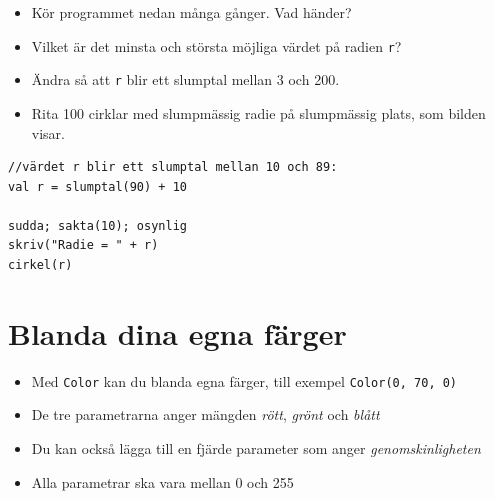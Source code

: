 \begin{itemize}

\item {Kör programmet nedan många gånger. Vad händer?}
\item {Vilket är det minsta och största möjliga värdet på radien \lstinline{r}?}
\item {Ändra så att \lstinline{r} blir ett slumptal mellan 3 och 200.}
\item {Rita 100 cirklar med slumpmässig radie på slumpmässig plats, som bilden visar.}

\end{itemize}



  

\begin{lstlisting}[basicstyle={\ttfamily\fontsize{20}{24}\selectfont},numbers=none]
//värdet r blir ett slumptal mellan 10 och 89:
val r = slumptal(90) + 10   

sudda; sakta(10); osynlig
skriv("Radie = " + r)
cirkel(r)
\end{lstlisting}
        
\chapter{Blanda dina egna färger}

\begin{itemize}

\item {Med \lstinline{Color} kan du blanda egna färger, till exempel \lstinline{Color(0, 70, 0)}}
\item {De tre parametrarna anger mängden {\it rött}, {\it grönt} och {\it blått}}
\item {Du kan också lägga till en fjärde parameter som anger {\it genomskinligheten}}
\item {Alla parametrar ska vara mellan 0 och 255}

\end{itemize}


